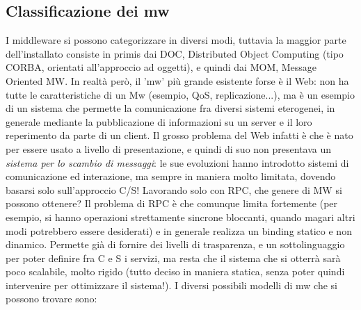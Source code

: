 \subsection{Classificazione dei mw}
I middleware si possono categorizzare in diversi modi, tuttavia la maggior parte dell'installato consiste in primis
dai DOC, Distributed Object Computing (tipo CORBA, orientati all'approccio ad oggetti), e quindi dai MOM, Message
Oriented MW. In realtà però, il 'mw' più grande esistente forse è il Web: non ha tutte le caratteristiche di un Mw
(esempio, QoS, replicazione...), ma è un esempio di un sistema che permette la comunicazione fra diversi sistemi
eterogenei, in generale mediante la pubblicazione di informazioni su un server e il loro reperimento da parte di un
client. Il grosso problema del Web infatti è che è nato per essere usato a livello di presentazione, e quindi di suo
non presentava un \textit{sistema per lo scambio di messaggi}: le sue evoluzioni hanno introdotto sistemi di
comunicazione ed interazione, ma sempre in maniera molto limitata, dovendo basarsi solo sull'approccio C/S!
Lavorando solo con RPC, che genere di MW si possono ottenere? Il problema di RPC è che comunque limita fortemente
(per esempio, si hanno operazioni strettamente sincrone bloccanti, quando magari altri modi potrebbero essere
desiderati) e in generale realizza un binding statico e non dinamico. Permette già di fornire dei livelli di
trasparenza, e un sottolinguaggio per poter definire fra C e S i servizi, ma resta che il sistema che si otterrà sarà
poco scalabile, molto rigido (tutto deciso in maniera statica, senza poter quindi intervenire per ottimizzare il
sistema!).
I diversi possibili modelli di mw che si possono trovare sono:
